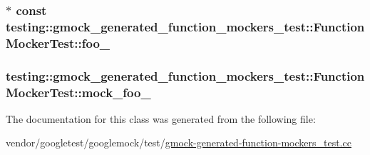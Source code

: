 \subsubsection[{\texorpdfstring{foo\+\_\+}{foo_}}]{$\ast$ const testing\+::gmock\+\_\+generated\+\_\+function\+\_\+mockers\+\_\+test\+::\+Function\+Mocker\+Test\+::foo\+\_\+\hspace{0.3cm}{\ttfamily [protected]}}\hypertarget{classtesting_1_1gmock__generated__function__mockers__test_1_1FunctionMockerTest_ae2b8b577c4808f2dff9797168468f65f}{}\label{classtesting_1_1gmock__generated__function__mockers__test_1_1FunctionMockerTest_ae2b8b577c4808f2dff9797168468f65f}
\subsubsection[{\texorpdfstring{mock\+\_\+foo\+\_\+}{mock_foo_}}]{ testing\+::gmock\+\_\+generated\+\_\+function\+\_\+mockers\+\_\+test\+::\+Function\+Mocker\+Test\+::mock\+\_\+foo\+\_\+\hspace{0.3cm}{\ttfamily [protected]}}\hypertarget{classtesting_1_1gmock__generated__function__mockers__test_1_1FunctionMockerTest_a265659f07a0e75152ab295add4769585}{}\label{classtesting_1_1gmock__generated__function__mockers__test_1_1FunctionMockerTest_a265659f07a0e75152ab295add4769585}


The documentation for this class was generated from the following file\+:\begin{DoxyCompactItemize}
\item 
vendor/googletest/googlemock/test/\hyperlink{gmock-generated-function-mockers__test_8cc}{gmock-\/generated-\/function-\/mockers\+\_\+test.\+cc}\end{DoxyCompactItemize}
